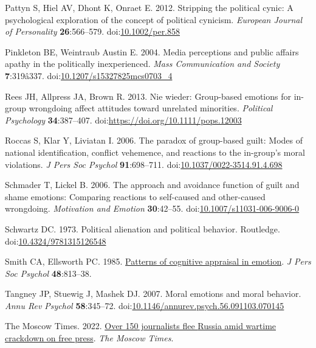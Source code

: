 \documentclass[
]{article}
\newlength{\cslhangindent}
\newenvironment{CSLReferences}[2] %
 {\begin{list}{}{%
  \setlength{\itemindent}{0pt}
  \setlength{\leftmargin}{0pt}
  \setlength{\parsep}{0pt}
  \ifodd #1
   \setlength{\leftmargin}{\cslhangindent}
   \setlength{\itemindent}{-1\cslhangindent}
  \fi
  \setlength{\itemsep}{#2\baselineskip}}}
 {\end{list}}
\begin{document}
\begin{CSLReferences}{1}{0}
Pattyn S, Hiel AV, Dhont K, Onraet E. 2012. Stripping the political cynic: A psychological exploration of the concept of political cynicism. \emph{European Journal of Personality} \textbf{26}:566--579. doi:\href{https://doi.org/10.1002/per.858}{10.1002/per.858}

Pinkleton BE, Weintraub Austin E. 2004. Media perceptions and public affairs apathy in the politically inexperienced. \emph{Mass Communication and Society} \textbf{7}:319â337. doi:\href{https://doi.org/10.1207/s15327825mcs0703_4}{10.1207/s15327825mcs0703\_4}

Rees JH, Allpress JA, Brown R. 2013. Nie wieder: Group-based emotions for in-group wrongdoing affect attitudes toward unrelated minorities. \emph{Political Psychology} \textbf{34}:387--407. doi:\url{https://doi.org/10.1111/pops.12003}

Roccas S, Klar Y, Liviatan I. 2006. The paradox of group-based guilt: Modes of national identification, conflict vehemence, and reactions to the in-group's moral violations. \emph{J Pers Soc Psychol} \textbf{91}:698--711. doi:\href{https://doi.org/10.1037/0022-3514.91.4.698}{10.1037/0022-3514.91.4.698}

Schmader T, Lickel B. 2006. The approach and avoidance function of guilt and shame emotions: Comparing reactions to self-caused and other-caused wrongdoing. \emph{Motivation and Emotion} \textbf{30}:42--55. doi:\href{https://doi.org/10.1007/s11031-006-9006-0}{10.1007/s11031-006-9006-0}

Schwartz DC. 1973. Political alienation and political behavior. Routledge. doi:\href{https://doi.org/10.4324/9781315126548}{10.4324/9781315126548}

Smith CA, Ellsworth PC. 1985. \href{https://www.ncbi.nlm.nih.gov/pubmed/3886875}{Patterns of cognitive appraisal in emotion}. \emph{J Pers Soc Psychol} \textbf{48}:813--38.

Tangney JP, Stuewig J, Mashek DJ. 2007. Moral emotions and moral behavior. \emph{Annu Rev Psychol} \textbf{58}:345--72. doi:\href{https://doi.org/10.1146/annurev.psych.56.091103.070145}{10.1146/annurev.psych.56.091103.070145}

The Moscow Times. 2022. \href{https://www.themoscowtimes.com/2022/03/07/over-150-journalists-flee-russia-amid-wartime-crackdown-on-free-press-reports-a76809\%20on\%2030.03.2023}{Over 150 journalists flee {Russia} amid wartime crackdown on free press}. \emph{The Moscow Times}.


\end{CSLReferences}
\end{document}
